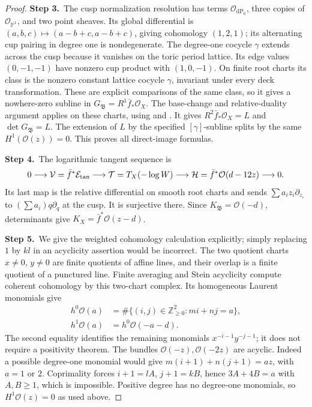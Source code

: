 \begin{proof}
\par\smallskip\noindent\textbf{Step 3.}\ The cusp normalization resolution has terms
$\mathcal O_{\mathrm{dP}_6}$, three copies of
$\mathcal O_{\mathbb P^1}$, and two point sheaves.
Its global differential is $(a,b,c)\mapsto
(a-b+c,a-b+c)$, giving cohomology $(1,2,1)$; its alternating cup
pairing in degree one is nondegenerate.  The degree-one cocycle
$\gamma$ extends across the cusp because it vanishes on the toric
period lattice.  Its edge values $(0,-1,-1)$ have nonzero cup
product with $(1,0,-1)$.  On finite root charts its class is the
nonzero constant lattice cocycle $\gamma$, invariant under every
deck transformation.  These are explicit comparisons of the
same class, so it gives a nowhere-zero subline in
$G_{\mathfrak B}=R^1\bar f_*\mathcal O_X$.
The base-change and relative-duality argument applies on these charts, using \cite[III.4.12]{BS76} and \cite[pp.~264--266]{RRV71}.  It gives $R^2\bar f_*\mathcal O_X=L$ and
$\det G_{\mathfrak B}=L$.  The extension of $L$ by the specified
$[\gamma]$-subline splits by the same $H^1(\mathcal O(z))=0$.
This proves all direct-image formulas.

\par\smallskip\noindent\textbf{Step 4.}\ The logarithmic tangent sequence is
\[
 0\longrightarrow\mathcal V=\bar f^*\mathcal E_{\rm tan}
 \longrightarrow\mathcal T=T_X(-\log W)
 \longrightarrow\mathcal H=\bar f^*\mathcal O(d-12z)
 \longrightarrow0.
\]
Its last map is the relative differential on smooth root charts
and sends $\sum a_i z_i\partial_{z_i}$ to
$(\sum a_i)q\partial_q$ at the cusp.  It is surjective there.
Since $K_{\mathfrak B}=\mathcal O(-d)$, determinants give
$K_X=\bar f^*\mathcal O(z-d)$.

\par\smallskip\noindent\textbf{Step 5.}\ We give the weighted cohomology calculation explicitly; simply
replacing $1$ by $kl$ in an acyclicity assertion would be incorrect.
The two quotient charts $x\ne0$, $y\ne0$ are finite quotients
of affine lines, and their overlap is a finite quotient of a
punctured line.  Finite averaging and Stein acyclicity compute
coherent cohomology by this two-chart complex.  Its homogeneous
Laurent monomials give
\[
 \begin{split}
 h^0\mathcal O(a)&=\#\{(i,j)\in\mathbb Z_{\ge0}^2:mi+nj=a\},\\
 h^1\mathcal O(a)&=h^0\mathcal O(-a-d).
 \end{split}
\]
The second equality identifies the remaining monomials
$x^{-i-1}y^{-j-1}$; it does not require a positivity theorem.
The bundles $\mathcal O(-z),\mathcal O(-2z)$ are acyclic.
Indeed a possible degree-one monomial would give
$m(i+1)+n(j+1)=az$, with $a=1$ or $2$.
Coprimality forces $i+1=lA$, $j+1=kB$, hence
$3A+4B=a$ with $A,B\ge1$, which is impossible.
Positive degree has no degree-one monomials, so
$H^1\mathcal O(z)=0$ as used above.


\end{proof}
